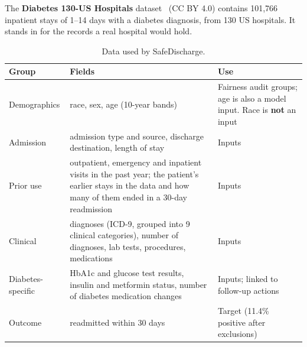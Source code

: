 \documentclass[10pt,a4paper]{article}
\begin{document}
The \textbf{Diabetes 130-US Hospitals} dataset~\cite{strack2014} (CC BY 4.0) contains 101,766 inpatient stays of 1–14 days with a diabetes diagnosis, from 130 US hospitals. It stands in for the records a real hospital would hold.
\begin{table}[htbp]
\centering
\caption{Data used by SafeDischarge.}\label{tab:2}
\begin{tabularx}{\textwidth}{>{\raggedright\arraybackslash\hsize=0.461\hsize}X>{\raggedright\arraybackslash\hsize=1.580\hsize}X>{\raggedright\arraybackslash\hsize=0.959\hsize}X}
\toprule
\textbf{Group} & \textbf{Fields} & \textbf{Use} \\
\midrule
Demographics & race, sex, age (10-year bands) & Fairness audit groups; age is also a model input. Race is \textbf{not} an input \\
Admission & admission type and source, discharge destination, length of stay & Inputs \\
Prior use & outpatient, emergency and inpatient visits in the past year; the patient's earlier stays in the data and how many of them ended in a 30-day readmission & Inputs \\
Clinical & diagnoses (ICD-9, grouped into 9 clinical categories), number of diagnoses, lab tests, procedures, medications & Inputs \\
Diabetes-specific & HbA1c and glucose test results, insulin and metformin status, number of diabetes medication changes & Inputs; linked to follow-up actions \\
Outcome & readmitted within 30 days & Target (11.4\% positive after exclusions) \\
\bottomrule
\end{tabularx}
\end{table}
\end{document}
